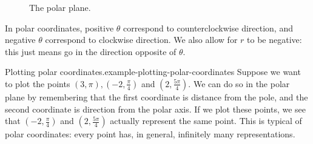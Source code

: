 \documentclass[10pt,]{book}
\numberwithin{equation}{section}
\begin{document}
\begin{figure}
\centering
{
}
\caption{The polar plane.\label{figure-polar-plane}}
\end{figure}
\hypertarget{p-1017}{}%
In polar coordinates, positive \(\theta\) correspond to counterclockwise direction, and negative \(\theta\) correspond to clockwise direction. We also allow for \(r\) to be negative: this just means go in the direction opposite of \(\theta\).%
\begin{example}{Plotting polar coordinates.}{example-plotting-polar-coordinates}%
\hypertarget{p-1018}{}%
Suppose we want to plot the points \((3,\pi), (-2,\frac{\pi}{4})\) and \((2,\frac{5\pi}{4}).\) We can do so in the polar plane by remembering that the first coordinate is distance from the pole, and the second coordinate is direction from the polar axis. If we plot these points, we see that \((-2,\frac{\pi}{4})\) and \((2,\frac{5\pi}{4})\) actually represent the same point. This is typical of polar coordinates: every point has, in general, infinitely many representations.%
\end{example}
\end{document}
